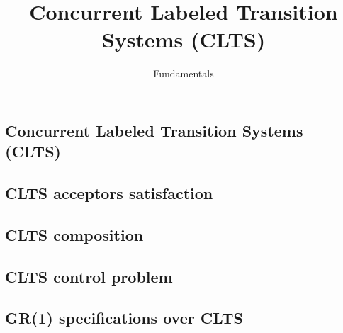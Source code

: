 \documentclass{article}
\title{Concurrent Labeled Transition Systems (CLTS)} %
\author{Fundamentals} %
\date{}
\begin{document}
\maketitle

\setcounter{section}{1} %
\setcounter{theorem}{1} %

\subsection{Concurrent Labeled Transition Systems (CLTS)}


\subsection{CLTS acceptors satisfaction}


%

\subsection{CLTS composition}


\subsection{CLTS control problem}


\subsection{GR(1) specifications over CLTS}


%

%
\end{document}
